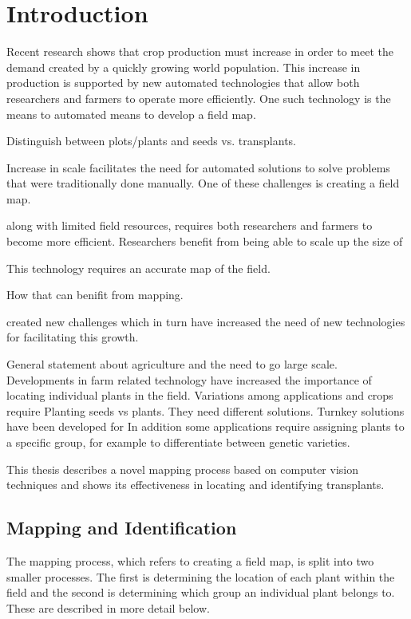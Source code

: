 
\cleardoublepage

\chapter{Introduction}
\label{introduction}

Recent research shows that crop production must increase in order to meet the demand created by a quickly growing world population.  This increase in production is supported by new automated technologies that allow both researchers and farmers to operate more efficiently.  One such technology is the means to automated means to develop a field map.  

Distinguish between plots/plants and seeds vs. transplants.     

Increase in scale facilitates the need for automated solutions to solve problems that were traditionally done manually.  One of these challenges is creating a field map.

  along with limited field resources, requires both researchers and farmers to become more efficient.  Researchers benefit from being able to scale up the size of 

This technology requires an accurate map of the field. 

How that can benifit from mapping.  

created new challenges 
   which in turn have increased the need of new technologies for facilitating this growth.

General statement about agriculture and the need to go large scale.  Developments in farm related technology have increased the importance of locating individual plants in the field.  Variations among applications and crops require   Planting seeds vs plants.  They need different solutions.  Turnkey solutions have been developed for   In addition some applications require assigning plants to a specific group, for example to differentiate between genetic varieties.   

This thesis describes a novel mapping process based on computer vision techniques and shows its effectiveness in locating and identifying transplants.

\section{Mapping and Identification}

The mapping process, which refers to creating a field map, is split into two smaller processes.  The first is determining the location of each plant within the field and the second is determining which group an individual plant belongs to. These are described in more detail below. 

